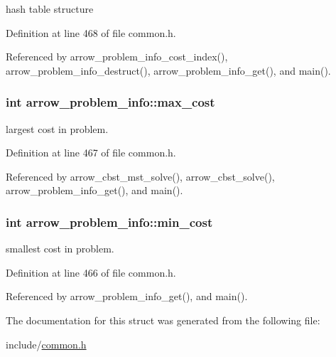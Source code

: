 hash table structure 

Definition at line 468 of file common.h.

Referenced by arrow\_\-problem\_\-info\_\-cost\_\-index(), arrow\_\-problem\_\-info\_\-destruct(), arrow\_\-problem\_\-info\_\-get(), and main().\hypertarget{structarrow__problem__info_724060f3be25521cca761899913c2776}{
\subsubsection[{max\_\-cost}]{\setlength{\rightskip}{0pt plus 5cm}int {\bf arrow\_\-problem\_\-info::max\_\-cost}}}
\label{structarrow__problem__info_724060f3be25521cca761899913c2776}


largest cost in problem. 

Definition at line 467 of file common.h.

Referenced by arrow\_\-cbst\_\-mst\_\-solve(), arrow\_\-cbst\_\-solve(), arrow\_\-problem\_\-info\_\-get(), and main().\hypertarget{structarrow__problem__info_46fabcc0ccd3a732cebb014331d4eeb5}{
\subsubsection[{min\_\-cost}]{\setlength{\rightskip}{0pt plus 5cm}int {\bf arrow\_\-problem\_\-info::min\_\-cost}}}
\label{structarrow__problem__info_46fabcc0ccd3a732cebb014331d4eeb5}


smallest cost in problem. 

Definition at line 466 of file common.h.

Referenced by arrow\_\-problem\_\-info\_\-get(), and main().

The documentation for this struct was generated from the following file:\begin{CompactItemize}
\item 
include/\hyperlink{common_8h}{common.h}\end{CompactItemize}
